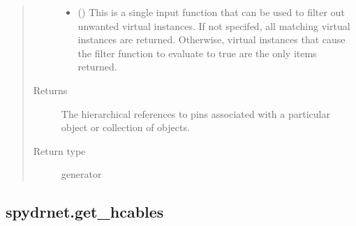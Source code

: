 \documentclass[letterpaper,10pt,english,openany,oneside]{sphinxmanual}
\begin{document}
\begin{fulllineitems}
\begin{quote}
\begin{description}
\begin{itemize}
\item {} 
 () \textendash{} This is a single input function that can be used to filter out unwanted virtual instances. If not specifed, all
matching virtual instances are returned. Otherwise, virtual instances that cause the filter function to evaluate
to true are the only items returned.

\end{itemize}

\item[{Returns}] \leavevmode
{} \textendash{} The hierarchical references to pins associated with a particular object or collection of objects.

\item[{Return type}] \leavevmode
generator

\end{description}\end{quote}

\end{fulllineitems}



\subsection{spydrnet.get\_hcables}
\label{\detokenize{reference/classes/generated/spydrnet.get_hcables:spydrnet-get-hcables}}\label{\detokenize{reference/classes/generated/spydrnet.get_hcables::doc}}
\end{document}
